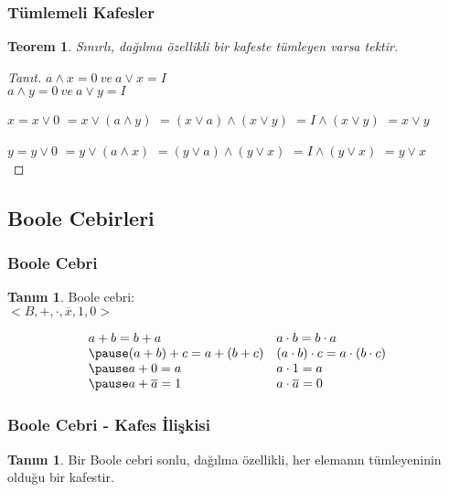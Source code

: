 \documentclass[dvipsnames]{beamer}
\theoremstyle{definition}
\newtheorem{tanim}[theorem]{Tanım}
\theoremstyle{example}
\theoremstyle{plain}
\newtheorem{teorem}[theorem]{Teorem}
\begin{document}
\begin{frame}
  \frametitle{Tümlemeli Kafesler}

  \begin{teorem}
    Sınırlı, dağılma özellikli bir kafeste tümleyen varsa tektir.
  \end{teorem}

  \pause
  \begin{proof}[Tanıt]
    $a \wedge x = 0 ~ve~ a \vee x = I$\\
    $a \wedge y = 0 ~ve~ a \vee y = I$

    \pause
    \medskip
    $x = x \vee 0$ \pause $ = x \vee (a \wedge y)$
      \pause $ = (x \vee a) \wedge (x \vee y)$
      \pause $ = I \wedge (x \vee y)$ \pause $ = x \vee y$

    \pause
    $y = y \vee 0$ \pause $ = y \vee (a \wedge x)$
      \pause $ = (y \vee a) \wedge (y \vee x)$
      \pause $ = I \wedge (y \vee x)$ \pause $ = y \vee x$\\
  \end{proof}
\end{frame}

\subsection{Boole Cebirleri}

\begin{frame}
  \frametitle{Boole Cebri}

  \begin{tanim}
    \alert{Boole cebri}:\\
    $<B,+,\cdot,\overline{x},1,0>$

    \pause
    \[\begin{array}{ll}
      a + b = b + a &
      a \cdot b = b \cdot a\\ \pause
      (a + b) + c = a + (b + c) &
      (a \cdot b) \cdot c = a \cdot (b \cdot c)\\ \pause
      a + 0 = a &
      a \cdot 1 = a\\ \pause
      a + \overline{a} = 1 &
      a \cdot \overline{a} = 0
    \end{array}\]
  \end{tanim}
\end{frame}

\begin{frame}
  \frametitle{Boole Cebri - Kafes İlişkisi}

  \begin{tanim}
    Bir Boole cebri sonlu, dağılma özellikli, her elemanın tümleyeninin olduğu
    bir kafestir.
  \end{tanim}
\end{frame}
\end{document}
